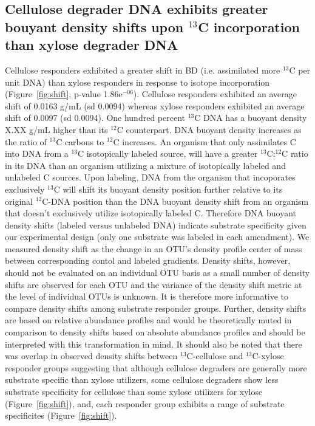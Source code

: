 \subsection{Cellulose degrader DNA exhibits greater bouyant density shifts upon
$^{13}$C incorporation than xylose degrader DNA} 
Cellulose responders exhibited a greater shift in BD (i.e. assimilated more
$^{13}$C per unit DNA) than xylose responders in response to isotope
incorporation (Figure~\ref{fig:shift}, p-value 1.86e$^{-06}$). Cellulose
responders exhibited an average shift of 0.0163 g/mL (sd 0.0094) whereas xylose
responders exhibited an average shift of 0.0097 (sd 0.0094).
One hundred percent $^{13}$C DNA has a buoyant density X.XX g/mL higher than
its $^{12}$C counterpart. DNA buoyant density increases as the
ratio of $^{13}$C carbons to $^{12}$C increases. An organism that only
assimilates C into DNA from a $^{13}$C isotopically labeled source, will have a
greater $^{13}$C:$^{12}$C ratio in its DNA than an organism utilizing a mixture
of isotopically labeled and unlabeled C sources. Upon labeling, DNA from the
organism that incoporates exclusively $^{13}$C will shift its buoyant density
position further relative to its original $^{12}$C-DNA position than the DNA
buoyant density shift from an organism that doesn't exclusively utilize
isotopically labeled C. Therefore DNA buoyant density shifts (labeled versus
unlabeled DNA) indicate substrate specificity given our experimental design (only
one substrate was labeled in each amendment).  We measured density shift as
the change in an OTU's density profile center of mass between corresponding
contol and labeled gradients. Density shifts, however, should not be evaluated
on an individual OTU basis as a small number of density shifts are observed for
each OTU and the variance of the density shift metric at the level of
individual OTUs is unknown. It is therefore more informative to compare density
shifts among substrate responder groups. Further, density shifts are based on
relative abundance profiles and would be theoretically muted in comparison to
density shifts based on absolute abundance profiles and should be interpreted
with this transformation in mind. It should also be noted that there was
overlap in observed density shifts between $^{13}$C-cellulose and
$^{13}$C-xylose responder groups suggesting that although cellulose degraders
are generally more substrate specific than xylose utilizers, some cellulose
degraders show less substrate specificity for cellulose than some xylose
utilizers for xylose (Figure~\ref{fig:shift}), and, each responder group
exhibits a range of substrate specificites (Figure~\ref{fig:shift}).

